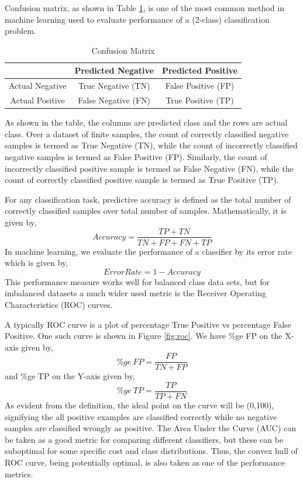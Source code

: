 \documentclass[10pt,journal,compsoc]{IEEEtran}
\begin{document}
Confusion matrix, as shown in Table \ref{tab:confmat}, is one of the most common method in machine learning used to evaluate performance of a (2-class) classification problem.

\begin{table}[!b]
    \centering
    \begin{tabular}{|c||c|c|}
    	\hline
         & Predicted Negative & Predicted Positive  \\ \hline \hline  
        Actual Negative & True Negative (TN) & False Positive (FP) \\ \hline
        Actual Positive & False Negative (FN) & True Positive (TP) \\ \hline 
    \end{tabular}
    \caption{Confusion Matrix}
    \label{tab:confmat}
\end{table}

As shown in the table, the columns are predicted class and the rows are actual class. 
Over a dataset of finite samples, the count of correctly classified negative samples is termed as True Negative (TN), while the count of incorrectly classified negative samples is termed as False Positive (FP).
Similarly, the count of incorrectly classified positive sample is termed as False Negative (FN), while the count of correctly classified positive sample is termed as True Positive (TP).


For any classification task, predictive accuracy is defined as the total number of correctly classified samples over total number of samples. 
Mathematically, it is given by, $$ Accuracy = \frac{TP + TN}{TN + FP + FN + TP}$$
In machine learning, we evaluate the performance of a classifier by its error rate which is given by, $$Error Rate = 1 - Accuracy$$
This performance measure works well for balanced class data sets, but for imbalanced datasets a much wider used metric is the Receiver Operating Characteristics (ROC) curves. 

A typically ROC curve is a plot of percentage True Positive vs percentage False Positive. 
One such curve is shown in Figure \ref{fig:roc}.
We have \%ge FP on the X-axis given by, $$\%ge~FP = \frac{FP}{TN + FP}$$
and \%ge TP on the Y-axis given by, $$\%ge~TP = \frac{TP}{TP + FN}$$
As evident from the definition, the ideal point on the curve will be (0,100), signifying the all positive examples are classified correctly while no negative samples are classified wrongly as positive.
The Area Under the Curve (AUC) can be taken as a good metric for comparing different classifiers, but these can be suboptimal for some specific cost and class distributions.
Thus, the convex hull of ROC curve, being potentially optimal, is also taken as one of the performance metrics.
\end{document}
